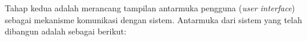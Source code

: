 Tahap kedua adalah merancang tampilan antarmuka pengguna (\textit{user interface}) sebagai mekanisme komunikasi dengan sistem. Antarmuka dari sistem yang telah dibangun adalah sebagai berikut:
\begin{enumerate}[a.]




\end{enumerate}

